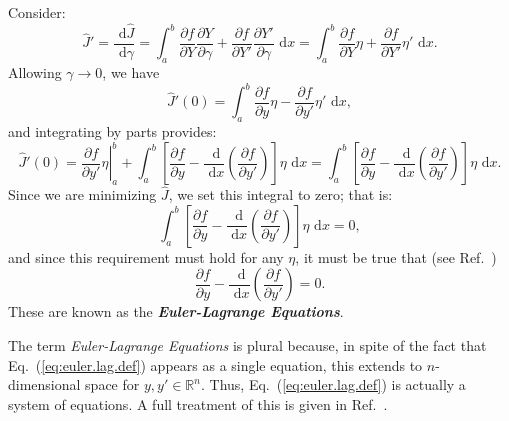 \begin{definition}
Consider:
\begin{equation}
\hat J' = \frac{\text{ d}\hat J}{\text{ d} \gamma} = \int_a^b{\frac{\partial f}{\partial Y}\frac{\partial Y}{\partial \gamma}+\frac{\partial f}{\partial Y'}\frac{\partial Y'}{\partial \gamma}}\text{ d}x = \int_a^b{\frac{\partial f}{\partial Y}\eta+\frac{\partial f}{\partial Y'}\eta'}\text{ d}x.
\end{equation}
Allowing $\gamma\to 0$, we have
\begin{equation}
\hat J'(0) = \int_a^b{\frac{\partial f}{\partial y}\eta-\frac{\partial f}{\partial y'}\eta'}\text{ d}x,
\end{equation}
and integrating by parts provides:
\begin{equation}
 \hat J'(0) = \left.\frac{\partial f}{\partial y'}\eta\right|_a^b +\int_a^b{\left[\frac{\partial f}{\partial y}-\frac{\text{ d}}{\text{ d}x}\left(\frac{\partial f}{\partial y'}\right)\right]}\eta\text{ d}x = \int_a^b{\left[\frac{\partial f}{\partial y}-\frac{\text{ d}}{\text{ d}x}\left(\frac{\partial f}{\partial y'}\right)\right]}\eta\text{ d}x.
 \end{equation}
Since we are minimizing $\hat J$, we set this integral to zero; that is:
\begin{equation}
\int_a^b{\left[\frac{\partial f}{\partial y}-\frac{\text{ d}}{\text{ d}x}\left(\frac{\partial f}{\partial y'}\right)\right]}\eta\text{ d}x = 0,
\end{equation}
and since this requirement must hold for any $\eta$, it must be true that (see Ref.~\cite{weinstock1974calculus}) 
\begin{equation}
\frac{\partial f}{\partial y}-\frac{\text{ d}}{\text{ d}x}\left(\frac{\partial f}{\partial y'}\right) = 0.
\label{eq:euler.lag.def}
\end{equation}
These are known as the \emph{\textbf{Euler-Lagrange Equations}}.
\end{definition}
The term \emph{Euler-Lagrange Equations} is plural because, in spite of the fact that Eq.~(\ref{eq:euler.lag.def}) appears as a single equation, this extends to $n$-dimensional space for $y,y'\in\mathbb R^n$. Thus, Eq.~(\ref{eq:euler.lag.def}) is actually a system of equations. A full treatment of this is given in Ref.~\cite{cornelius1970variational}.

